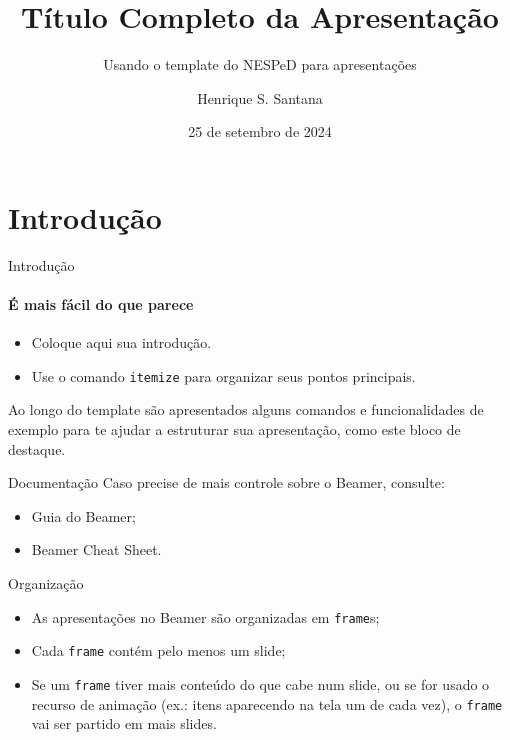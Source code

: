 \documentclass{beamer}
\title[Título Curto]{Título Completo da Apresentação}
\subtitle{Usando o template do NESPeD para apresentações}
\author{Henrique S. Santana}
\institute[UFV]{Universidade Federal de Viçosa}
\date{25 de setembro de 2024}
\begin{document}

\tocframe[]

\section{Introdução}

\begin{frame}{Introdução}
    \framesubtitle{É mais fácil do que parece}
    
    \begin{itemize}
        \item Coloque aqui sua introdução.
        \item Use o comando \texttt{itemize} para organizar seus pontos principais.
    \end{itemize}
    
    \begin{block}{}
        Ao longo do template são apresentados alguns comandos e funcionalidades de exemplo para te ajudar a estruturar sua apresentação, como este bloco de destaque.
    \end{block}
    
\end{frame}

\begin{frame}{Documentação}
    Caso precise de mais controle sobre o Beamer, consulte:
    \begin{itemize}
        \item Guia do Beamer;~\cite{beamerclass}    
        \item Beamer Cheat Sheet.~\cite{beamercheat}
    \end{itemize}
\end{frame}

\begin{frame}{Organização}
    \begin{itemize}
        \item As apresentações no Beamer são organizadas em \texttt{frame}s;
        \item Cada \texttt{frame} contém pelo menos um slide;
        \item Se um \texttt{frame} tiver mais conteúdo do que cabe num slide, ou se for usado o recurso de animação (ex.: itens aparecendo na tela um de cada vez), o \texttt{frame} vai ser partido em mais slides.
    \end{itemize}
\end{frame}
\end{document}
